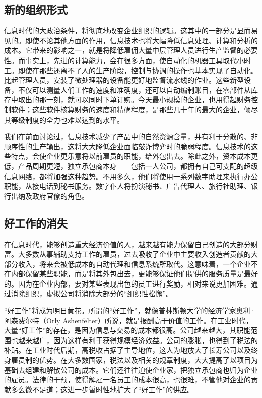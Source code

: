 \subsection{新的组织形式}
信息时代的大政治条件，将彻底地改变企业组织的逻辑。这其中的一部分是显而易见的。即使不论其他方面的作用，信息技术也将大幅降低信息处理、计算和分析的成本。它带来的影响之一，就是将降低雇佣大量中层管理人员进行生产监督的必要性。而事实上，先进的计算能力，会在很多方面，使自动化的机器工具取代小时工。即使在那些还离不了人的生产阶段，控制与协调的操作也基本实现了自动化。比起管理人员，安装了微处理器的设备能更好地监督流水线的作业。这些新型设备，不仅可以测量人们工作的速度和准确度，还可以自动编制账目，在零部件从库存中取出的那一刻，就可以同时下单订购。今天最小规模的企业，也用得起财务控制软件；这些软件核算财务的速度和精确程度，是那些几十年的最大的企业，倾尽其等级制度的全力也难以达到的水平。

我们在前面讨论过，信息技术减少了产品中的自然资源含量，并有利于分散的、非顺序性的生产输出，这将大大降低企业面临敲诈博弈时的脆弱程度。信息技术的这些特点，会使企业更乐意将以前雇员的职能，给外包出去。除此之外，资本成本更低，产品周期更短，独立承包商本身——包括一人公司，都拥有自己可支配的超级信息网络，都将加强这种趋势。不用多久，他们将使用一系列数字助理来执行办公职能，从接电话到秘书服务。数字仆人将扮演秘书、广告代理人、旅行社助理、银行出纳及政府官僚的角色。

\subsection{好工作的消失}
在信息时代，能够创造重大经济价值的人，越来越有能力保留自己创造的大部分财富。大多数从事辅助支持工作的雇员，过去吸收了企业中主要收入创造者贡献的大部分收入，将来会被低成本的自动代理和信息系统所取代。这意味着，一个企业不在内部保留某些职能，而是将其外包出去，更能够保证他们提供的服务质量是最好的。因为在企业内部，要对某些表现出色的员工进行奖励，相对来说更加困难。通过消除组织，虚拟公司将消除大部分的“组织性松懈”。

“好工作”将成为明日黄花。所谓的“好工作”，就像普林斯顿大学的经济学家奥利·阿森费尔特（Orly Ashenfelter）所说，就是报酬高于价值的工作。在工业时代，大量“好工作”的存在，是因为信息与交易的成本都很高。公司越来越大，其职能范围也越来越广，因为这样有利于获得规模经济效益。公司的膨胀，也得到了税法的补贴。在工业时代后期，高税收占据了主导地位，这人为地放大了长寿公司以及终身雇员制的优势。在大多数国家，税法以及相关的规章制度，大大提高了以项目为基础去组建和解散公司的成本。它们还往往迫使企业家，把独立承包商也归为企业的雇员。法律的干预，使得解雇一名员工的成本很高，也很难，不管他对企业的贡献多么微不足道；这进一步暂时性地扩大了“好工作”的供应。


